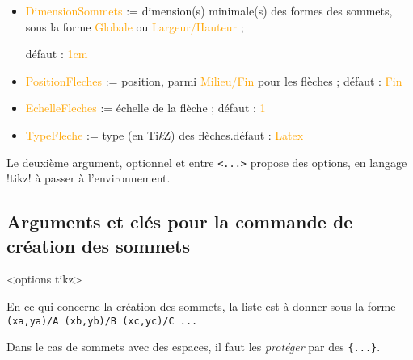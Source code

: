 \documentclass[french,a4paper,11pt]{article}
\providecommand\tikzlogo{Ti\textit{k}Z}
\let\TikZ\tikzlogo
\newcommand\Cle[1]{{\small\sffamily\textlangle \textcolor{orange}{#1}\textrangle}}
\begin{document}
{{\begin{tipblock}
\begin{itemize}
	\hfill~défaut : \Cle{vide}
	\item \Cle{DimensionSommets} := dimension(s) minimale(s) des formes des sommets, sous la forme \Cle{Globale} ou \Cle{Largeur/Hauteur} ;
	
	\hfill{}défaut : \Cle{1cm}
	\item \Cle{PositionFleches} := position, parmi \Cle{Milieu/Fin} pour les flèches ; \hfill{}défaut : \Cle{Fin}
	\item \Cle{EchelleFleches} := échelle de la flèche ; \hfill{}défaut : \Cle{1}
	\item \Cle{TypeFleche} := type (en \TikZ) des flèches.\hfill{}défaut : \Cle{Latex}
\end{itemize}

Le deuxième argument, optionnel et entre \texttt{<...>} propose des options, en langage \packagetex!tikz! à passer à l'environnement.
\end{tipblock}

\pagebreak

\subsection{Arguments et clés pour la commande de création des sommets}

\begin{DemoCode}
\begin{GrapheTikz}[clés]<options tikz>
\end{GrapheTikz}
\end{DemoCode}

\begin{tipblock}
En ce qui concerne la création des sommets, la liste est à donner sous la forme \verb!(xa,ya)/A (xb,yb)/B (xc,yc)/C ...!

\smallskip

Dans le cas de sommets avec des espaces, il faut les \textit{protéger} par des \texttt{\{...\}}.
\end{tipblock}

\begin{DemoCode}[]
\begin{GrapheTikz}[CouleurSommets={brown/purple},TypeSommets=ellipse,Police={}]
\end{GrapheTikz}
\end{DemoCode}

\begin{DemoCode}[]
\begin{GrapheTikz}[Epaisseur={very thick},Grille={5,4},DimensionSommets=1.5cm]
\end{GrapheTikz}
\end{DemoCode}

}}
\end{document}
